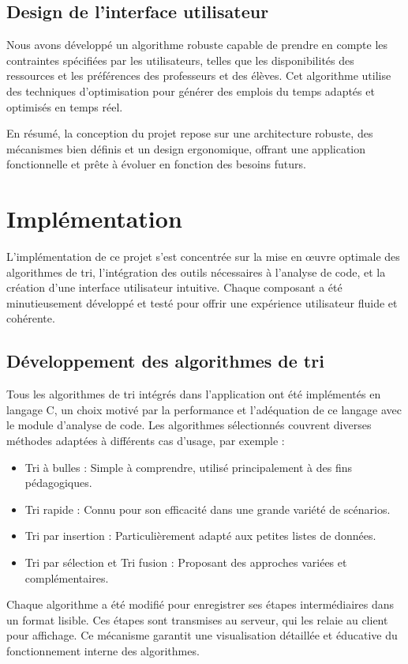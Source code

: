 \documentclass[a4paper, 12pt, twoside]{article}
\begin{document}
\subsection{Design de l’interface utilisateur}
Nous avons développé un algorithme robuste capable de prendre en compte les contraintes spécifiées par les utilisateurs, telles que les disponibilités des ressources et les préférences des professeurs et des élèves. Cet algorithme utilise des techniques d'optimisation pour générer des emplois du temps adaptés et optimisés en temps réel.
\vspace{100pt}

En résumé, la conception du projet repose sur une architecture robuste, des mécanismes bien définis et un design ergonomique, offrant une application fonctionnelle et prête à évoluer en fonction des besoins futurs.


\newpage
\section{Implémentation}
L’implémentation de ce projet s’est concentrée sur la mise en œuvre optimale des algorithmes de tri, l’intégration des outils nécessaires à l’analyse de code, et la création d’une interface utilisateur intuitive. Chaque composant a été minutieusement développé et testé pour offrir une expérience utilisateur fluide et cohérente.
\vspace{30pt}
\subsection{Développement des algorithmes de tri} 
Tous les algorithmes de tri intégrés dans l’application ont été implémentés en langage C, un choix motivé par la performance et l’adéquation de ce langage avec le module d’analyse de code. Les algorithmes sélectionnés couvrent diverses méthodes adaptées à différents cas d’usage, par exemple :
\begin{itemize}
\item Tri à bulles : Simple à comprendre, utilisé principalement à des fins pédagogiques.
\item Tri rapide : Connu pour son efficacité dans une grande variété de scénarios.
\item Tri par insertion : Particulièrement adapté aux petites listes de données.
\item Tri par sélection et Tri fusion : Proposant des approches variées et complémentaires.
\end{itemize}
Chaque algorithme a été modifié pour enregistrer ses étapes intermédiaires dans un format lisible. Ces étapes sont transmises au serveur, qui les relaie au client pour affichage. Ce mécanisme garantit une visualisation détaillée et éducative du fonctionnement interne des algorithmes.
\vspace{30pt}
\end{document}
